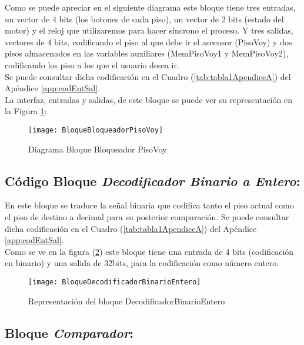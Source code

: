 	Como se puede apreciar en el siguiente diagrama este bloque tiene tres entradas, un vector de 4 bits (los botones de cada piso), un vector de 2 bits (estado del motor) y el reloj que utilizaremos para hacer síncrono el proceso. Y tres salidas, vectores de 4 bits, codificando el piso al que debe ir el ascensor (PisoVoy) y dos pisos almacenados en las variables auxiliares (MemPisoVoy1 y MemPisoVoy2), codificando los piso a los que el usuario desea ir. \\
	
	Se puede consultar dicha codificación en el Cuadro (\ref{tab:tabla1ApendiceA}) del Apéndice \ref{app:codEntSal}. \\
    
    La interfaz, entradas y salidas, de este bloque se puede ver su representación en la Figura \ref{fig:BloqueBloqueadorPisoVoy}:
    
    \begin{figure}[H]
		    \centering
		    \hspace*{-1.8cm}
		    \texttt{[image: BloqueBloqueadorPisoVoy]}
		    \caption{Diagrama Bloque Bloqueador PisoVoy}
		    \label{fig:BloqueBloqueadorPisoVoy}
	\end{figure}
	
\subsection{Código Bloque \textit{Decodificador Binario a Entero}:} \label{bloque:DecodificadorBinarioEntero}
	En este bloque se traduce la señal binaria que codifica tanto el piso actual como el piso de destino a decimal para su posterior comparación.
	Se puede consultar dicha codificación en el Cuadro (\ref{tab:tabla1ApendiceA}) del Apéndice \ref{app:codEntSal}. \\ 

	Como se ve en la figura (\ref{fig:BloqueDecodificadorBinarioEntero}) este bloque tiene una entrada de 4 bits (codificación en binario) y una salida de 32bits, para la codificación como número entero.
	\begin{figure}[H]
		    \centering
		    \texttt{[image: BloqueDecodificadorBinarioEntero]}
		    \caption{Representación del bloque DecodificadorBinarioEntero}
		    \label{fig:BloqueDecodificadorBinarioEntero}
	\end{figure}

\subsection{Bloque \textit{Comparador}:} \label{bloque:Comparador}


